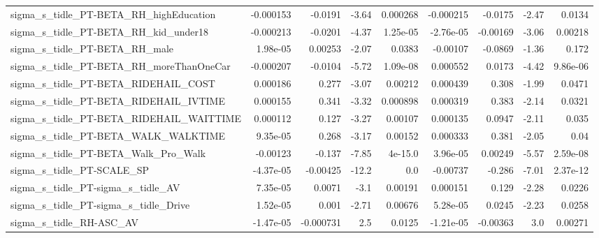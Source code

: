 \begin{tabular}{lrrrrrrrr}
sigma\_s\_tidle\_PT-BETA\_RH\_highEducation             &   -0.000153 &      -0.0191 &     -3.64 & 0.000268 &  -0.000215 &     -0.0175 &        -2.47 &        0.0134 \\
sigma\_s\_tidle\_PT-BETA\_RH\_kid\_under18               &   -0.000213 &      -0.0201 &     -4.37 & 1.25e-05 &  -2.76e-05 &    -0.00169 &        -3.06 &       0.00218 \\
sigma\_s\_tidle\_PT-BETA\_RH\_male                      &    1.98e-05 &      0.00253 &     -2.07 &   0.0383 &   -0.00107 &     -0.0869 &        -1.36 &         0.172 \\
sigma\_s\_tidle\_PT-BETA\_RH\_moreThanOneCar            &   -0.000207 &      -0.0104 &     -5.72 & 1.09e-08 &   0.000552 &      0.0173 &        -4.42 &      9.86e-06 \\
sigma\_s\_tidle\_PT-BETA\_RIDEHAIL\_COST                &    0.000186 &        0.277 &     -3.07 &  0.00212 &   0.000439 &       0.308 &        -1.99 &        0.0471 \\
sigma\_s\_tidle\_PT-BETA\_RIDEHAIL\_IVTIME              &    0.000155 &        0.341 &     -3.32 & 0.000898 &   0.000319 &       0.383 &        -2.14 &        0.0321 \\
sigma\_s\_tidle\_PT-BETA\_RIDEHAIL\_WAITTIME            &    0.000112 &        0.127 &     -3.27 &  0.00107 &   0.000135 &      0.0947 &        -2.11 &         0.035 \\
sigma\_s\_tidle\_PT-BETA\_WALK\_WALKTIME                &    9.35e-05 &        0.268 &     -3.17 &  0.00152 &   0.000333 &       0.381 &        -2.05 &          0.04 \\
sigma\_s\_tidle\_PT-BETA\_Walk\_Pro\_Walk                &    -0.00123 &       -0.137 &     -7.85 &  4e-15.0 &   3.96e-05 &     0.00249 &        -5.57 &      2.59e-08 \\
sigma\_s\_tidle\_PT-SCALE\_SP                          &   -4.37e-05 &     -0.00425 &     -12.2 &      0.0 &   -0.00737 &      -0.286 &        -7.01 &      2.37e-12 \\
sigma\_s\_tidle\_PT-sigma\_s\_tidle\_AV                  &    7.35e-05 &       0.0071 &      -3.1 &  0.00191 &   0.000151 &       0.129 &        -2.28 &        0.0226 \\
sigma\_s\_tidle\_PT-sigma\_s\_tidle\_Drive               &    1.52e-05 &        0.001 &     -2.71 &  0.00676 &   5.28e-05 &      0.0245 &        -2.23 &        0.0258 \\
sigma\_s\_tidle\_RH-ASC\_AV                            &   -1.47e-05 &    -0.000731 &       2.5 &   0.0125 &  -1.21e-05 &    -0.00363 &          3.0 &       0.00271 \\

\end{tabular}
